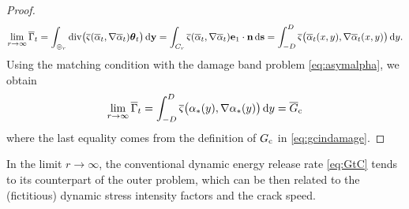 \begin{proof}
\[
\lim_{r\to\infty}\overline{\Gamma}_t=\int_{\circledcirc_r}\div\bigl(\overline{\varsigma}(\overline{\alpha}_t,\nabla\overline{\alpha}_t)\vtheta_t\bigr)\D{\vec{y}}=\int_{C_r}\overline{\varsigma}(\overline{\alpha}_t,\nabla\overline{\alpha}_t)\vec{e}_1\cdot\vec{n}\D{\vec{s}}=\int_{-D}^D\overline{\varsigma}\bigl(\overline{\alpha}_t(x,y),\nabla\overline{\alpha}_t(x,y)\bigr)\D{y}.
\]
Using the matching condition with the damage band problem \eqref{eq:asymalpha}, we obtain
\[
\lim_{r\to\infty}\overline{\Gamma}_t=\int_{-D}^D\overline{\varsigma}\bigl(\alpha_*(y),\nabla\alpha_*(y)\bigr)\,\mathrm{d}y=\overline{G}_{\mathrm{c}}
\]
where the last equality comes from the definition of $G_\mathrm{c}$ in \eqref{eq:gcindamage}.
\end{proof}

\begin{proposition} \label{prop:GalphatoG}
In the limit $r\to\infty$, the conventional dynamic energy release rate \eqref{eq:GtC} tends to its counterpart of the outer problem, which can be then related to the (fictitious) dynamic stress intensity factors and the crack speed.
\end{proposition}

